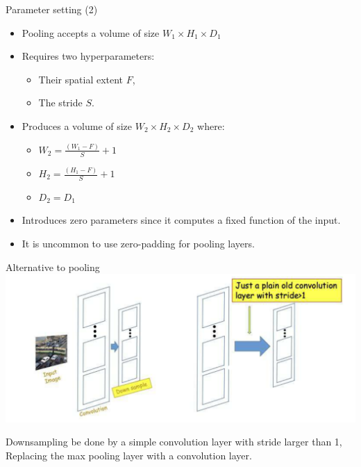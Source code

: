 \documentclass[default, aspectratio=169]{beamer}
\begin{document}
	\begin{frame}{Parameter setting (2)}
		\begin{itemize}
			\item Pooling accepts a volume of size $W_1 \times H_1 \times D_1$
			\item Requires two hyperparameters:
			\begin{itemize}
				\item Their spatial extent $F$,
				\item The stride $S$.
			\end{itemize}
			\item Produces a volume of size $W_2 \times H_2 \times D_2$ where:
			\begin{itemize}
				\item $W_2 = \frac{(W_1 - F)}{S} + 1$
				\item $H_2 = \frac{(H_1 - F)}{S} + 1$
				\item $D_2 = D_1$
			\end{itemize}
			\item Introduces zero parameters since it computes a fixed function of the input.
			\item It is uncommon to use zero-padding for pooling layers.
		\end{itemize}
	\end{frame}
	\begin{frame}{Alternative to pooling}
		\centering
		\includegraphics[keepaspectratio, scale=0.55]{pic/pooling3.png}
		\smallskip
		\begin{flushleft}
			Downsampling  be done by a simple convolution layer with stride larger than 1, Replacing the max pooling layer with a convolution layer.
		\end{flushleft}
	\end{frame}
\end{document}

